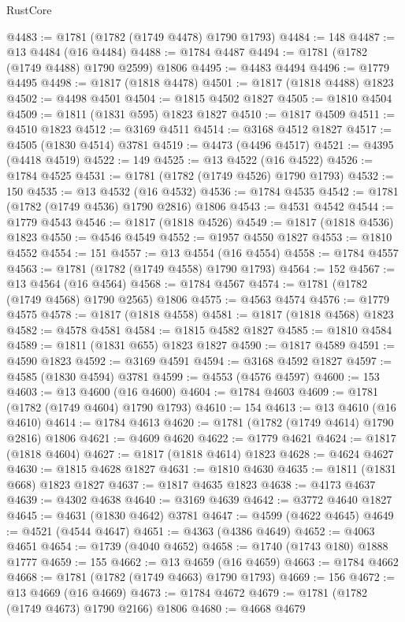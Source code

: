 \begin{lexlean}{RustCore}
\begin{coremodule}
@4483 := @1781 (@1782 (@1749 @4478) @1790 @1793)
@4484 := 148
@4487 := @13 @4484 (@16 @4484)
@4488 := @1784 @4487
@4494 := @1781 (@1782 (@1749 @4488) @1790 @2599) @1806
@4495 := @4483 @4494
@4496 := @1779 @4495
@4498 := @1817 (@1818 @4478)
@4501 := @1817 (@1818 @4488) @1823
@4502 := @4498 @4501
@4504 := @1815 @4502 @1827
@4505 := @1810 @4504
@4509 := @1811 (@1831 @595) @1823 @1827
@4510 := @1817 @4509
@4511 := @4510 @1823
@4512 := @3169 @4511
@4514 := @3168 @4512 @1827
@4517 := @4505 (@1830 @4514) @3781
@4519 := @4473 (@4496 @4517)
@4521 := @4395 (@4418 @4519)
@4522 := 149
@4525 := @13 @4522 (@16 @4522)
@4526 := @1784 @4525
@4531 := @1781 (@1782 (@1749 @4526) @1790 @1793)
@4532 := 150
@4535 := @13 @4532 (@16 @4532)
@4536 := @1784 @4535
@4542 := @1781 (@1782 (@1749 @4536) @1790 @2816) @1806
@4543 := @4531 @4542
@4544 := @1779 @4543
@4546 := @1817 (@1818 @4526)
@4549 := @1817 (@1818 @4536) @1823
@4550 := @4546 @4549
@4552 := @1957 @4550 @1827
@4553 := @1810 @4552
@4554 := 151
@4557 := @13 @4554 (@16 @4554)
@4558 := @1784 @4557
@4563 := @1781 (@1782 (@1749 @4558) @1790 @1793)
@4564 := 152
@4567 := @13 @4564 (@16 @4564)
@4568 := @1784 @4567
@4574 := @1781 (@1782 (@1749 @4568) @1790 @2565) @1806
@4575 := @4563 @4574
@4576 := @1779 @4575
@4578 := @1817 (@1818 @4558)
@4581 := @1817 (@1818 @4568) @1823
@4582 := @4578 @4581
@4584 := @1815 @4582 @1827
@4585 := @1810 @4584
@4589 := @1811 (@1831 @655) @1823 @1827
@4590 := @1817 @4589
@4591 := @4590 @1823
@4592 := @3169 @4591
@4594 := @3168 @4592 @1827
@4597 := @4585 (@1830 @4594) @3781
@4599 := @4553 (@4576 @4597)
@4600 := 153
@4603 := @13 @4600 (@16 @4600)
@4604 := @1784 @4603
@4609 := @1781 (@1782 (@1749 @4604) @1790 @1793)
@4610 := 154
@4613 := @13 @4610 (@16 @4610)
@4614 := @1784 @4613
@4620 := @1781 (@1782 (@1749 @4614) @1790 @2816) @1806
@4621 := @4609 @4620
@4622 := @1779 @4621
@4624 := @1817 (@1818 @4604)
@4627 := @1817 (@1818 @4614) @1823
@4628 := @4624 @4627
@4630 := @1815 @4628 @1827
@4631 := @1810 @4630
@4635 := @1811 (@1831 @668) @1823 @1827
@4637 := @1817 @4635 @1823
@4638 := @4173 @4637
@4639 := @4302 @4638
@4640 := @3169 @4639
@4642 := @3772 @4640 @1827
@4645 := @4631 (@1830 @4642) @3781
@4647 := @4599 (@4622 @4645)
@4649 := @4521 (@4544 @4647)
@4651 := @4363 (@4386 @4649)
@4652 := @4063 @4651
@4654 := @1739 (@4040 @4652)
@4658 := @1740 (@1743 @180) @1888 @1777
@4659 := 155
@4662 := @13 @4659 (@16 @4659)
@4663 := @1784 @4662
@4668 := @1781 (@1782 (@1749 @4663) @1790 @1793)
@4669 := 156
@4672 := @13 @4669 (@16 @4669)
@4673 := @1784 @4672
@4679 := @1781 (@1782 (@1749 @4673) @1790 @2166) @1806
@4680 := @4668 @4679

\end{coremodule}
\end{lexlean}
